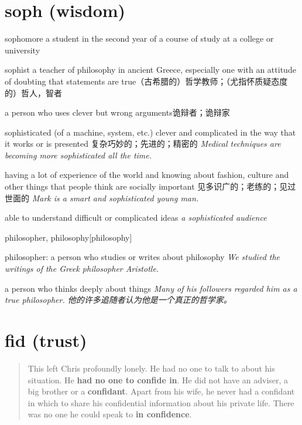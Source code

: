 \section{soph (wisdom)}

\begin{DefWord}{sophomore}
    a student in the second year of a course of study at a college or university
\end{DefWord}

\begin{DefWord}{sophist}
    a teacher of philosophy in ancient Greece, especially one with an attitude of doubting that statements are true（古希腊的）哲学教师；（尤指怀质疑态度的）哲人，智者

a person who uses clever but wrong arguments诡辩者；诡辩家
\end{DefWord}

\begin{DefWord}{sophisticated}
    (of a machine, system, etc.) clever and complicated in the way that it works or is presented 复杂巧妙的；先进的；精密的
    \textit{Medical techniques are becoming more sophisticated all the time.}


    having a lot of experience of the world and knowing about fashion, culture and other things that people think are socially important 见多识广的；老练的；见过世面的
    \textit{Mark is a smart and sophisticated young man.}

    able to understand difficult or complicated ideas
    \textit{a sophisticated audience}
\end{DefWord}

\begin{DefWord}{philosopher, philosophy}[philosophy]

    philosopher:
    a person who studies or writes about philosophy
    \textit{We studied the writings of the Greek philosopher Aristotle.}
    
    a person who thinks deeply about things
    \textit{Many of his followers regarded him as a true philosopher. 他的许多追随者认为他是一个真正的哲学家。}
\end{DefWord}


\section{fid (trust)}

\begin{quotation}
    This left Chris profoundly lonely. He had no one to talk to about his situation. He \textbf{had no one to confide in}. He did not have an adviser, a big brother or a \textbf{confidant}. Apart from his wife, he never had a confidant in which to share his confidential information about his private life. There was no one he could speak to \textbf{in confidence}.
\end{quotation}

